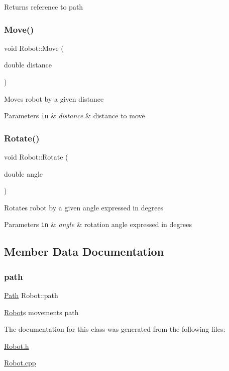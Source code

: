 \begin{DoxyReturn}{Returns}
reference to path 
\end{DoxyReturn}
\mbox{\label{classRobot_ab259b89805dff8afe10bac7fb25da974}} 
\subsubsection{\texorpdfstring{Move()}{Move()}}
{\footnotesize\ttfamily void Robot\+::\+Move (\begin{DoxyParamCaption}\item[{double}]{distance }\end{DoxyParamCaption})}

Moves robot by a given distance 
\begin{DoxyParams}[1]{Parameters}
\mbox{\tt in}  & {\em distance} & distance to move \\
\hline
\end{DoxyParams}
\mbox{\label{classRobot_a1cb405ec49d47c46f3aa87fde1415b59}} 
\subsubsection{\texorpdfstring{Rotate()}{Rotate()}}
{\footnotesize\ttfamily void Robot\+::\+Rotate (\begin{DoxyParamCaption}\item[{double}]{angle }\end{DoxyParamCaption})}

Rotates robot by a given angle expressed in degrees 
\begin{DoxyParams}[1]{Parameters}
\mbox{\tt in}  & {\em angle} & rotation angle expressed in degrees \\
\hline
\end{DoxyParams}


\subsection{Member Data Documentation}
\mbox{\label{classRobot_a82c025500915b17b863d254c5dff42bd}} 
\subsubsection{\texorpdfstring{path}{path}}
{\footnotesize\ttfamily \hyperlink{classPath}{Path} Robot\+::path\hspace{0.3cm}{\ttfamily [private]}}

\hyperlink{classRobot}{Robot}\textquotesingle{}s movement\textquotesingle{}s path 

The documentation for this class was generated from the following files\+:\begin{DoxyCompactItemize}
\item 
\hyperlink{Robot_8h}{Robot.\+h}\item 
\hyperlink{Robot_8cpp}{Robot.\+cpp}\end{DoxyCompactItemize}
